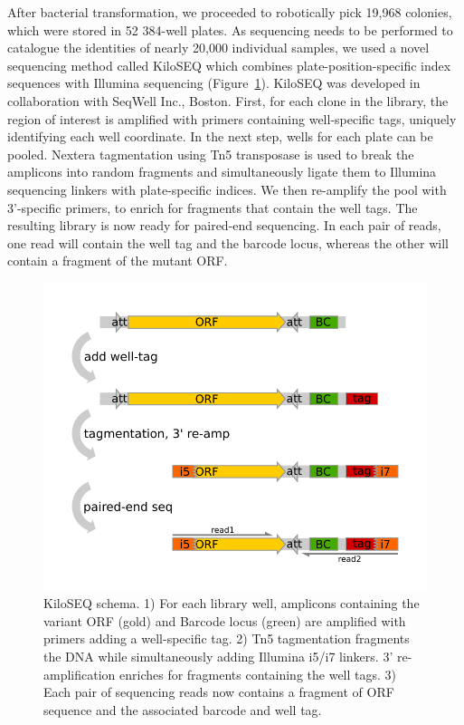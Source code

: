 After bacterial transformation, we proceeded to robotically pick 19,968 colonies, which were stored in 52 384-well plates. As sequencing needs to be performed to catalogue the identities of nearly 20,000 individual samples, we used a novel sequencing method called KiloSEQ which combines plate-position-specific index sequences with Illumina sequencing (Figure~\ref{fig:kiloseq_schema}).
KiloSEQ was developed in collaboration with SeqWell Inc., Boston. First, for each clone in the library, the region of interest is amplified with primers containing well-specific tags, uniquely identifying each well coordinate. In the next step, wells for each plate can be pooled. Nextera tagmentation using Tn5 transposase is used to break the amplicons into random fragments and simultaneously ligate them to Illumina sequencing linkers with plate-specific indices. We then re-amplify the pool with  3'-specific primers, to enrich for fragments that contain the well tags. The resulting library is now ready for paired-end sequencing. In each pair of reads, one read will contain the well tag and the barcode locus, whereas the other will contain a fragment of the mutant ORF.

\begin{figure}[h!]
	\centering
	\includegraphics[width=.5\textwidth]{img/kiloseq_schema_new.pdf}
	\caption{KiloSEQ schema. 1) For each library well, amplicons containing the variant ORF (gold) and Barcode locus (green) are amplified with primers adding a well-specific tag. 2) Tn5 tagmentation fragments the DNA while simultaneously adding Illumina i5/i7 linkers. 3' re-amplification enriches for fragments containing the well tags. 3) Each pair of sequencing reads now contains a fragment of ORF sequence and the associated barcode and well tag.}
	\label{fig:kiloseq_schema}
\end{figure}

